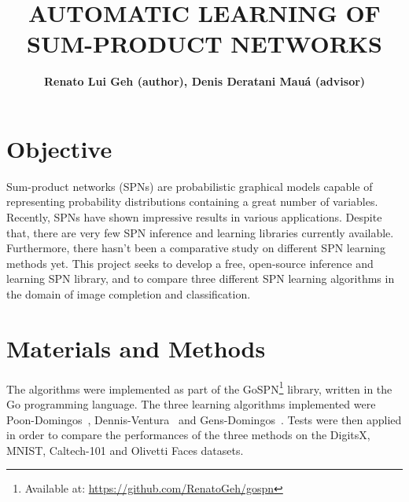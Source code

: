 \documentclass[10pt,a4paper]{article}
\title{AUTOMATIC LEARNING OF SUM-PRODUCT NETWORKS}
\author{\textbf{Renato Lui Geh (author), Denis Deratani Mauá (advisor)}}
\affil{Institute of Mathematics and Statistics, University of São Paulo}
\affil{\fontsize{10pt}{12}\selectfont\{renatolg,ddm\}@ime.usp.br}
\date{}
\begin{document}
\maketitle

\begin{multicols*}{2}

\section*{Objective}

Sum-product networks (SPNs) are probabilistic graphical models capable of representing probability
distributions containing a great number of variables. Recently, SPNs have shown impressive results
in various applications. Despite that, there are very few SPN inference and learning libraries
currently available. Furthermore, there hasn't been a comparative study on different SPN learning
methods yet. This project seeks to develop a free, open-source inference and learning SPN library,
and to compare three different SPN learning algorithms in the domain of image completion and
classification.


\section*{Materials and Methods}

The algorithms were implemented as part of the GoSPN\footnote{Available at:
  \url{https://github.com/RenatoGeh/gospn}} library, written in the Go programming language. The
three learning algorithms implemented were Poon-Domingos~\cite{poon-domingos},
Dennis-Ventura~\cite{clustering} and Gens-Domingos~\cite{gens-domingos}. Tests were then applied in
order to compare the performances of the three methods on the DigitsX, MNIST, Caltech-101 and
Olivetti Faces datasets.


\end{multicols*}
\end{document}
